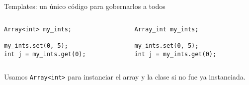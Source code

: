 \begin{frame}[fragile]{Templates: un \'unico c\'odigo para gobernarlos a todos}
   \begin{columns}
      \begin{column}{.5\linewidth}
         \begin{lstlisting}[style=normal]
Array<int> my_ints;

my_ints.set(0, 5);
int j = my_ints.get(0);
         \end{lstlisting}
      \end{column}
      \begin{column}{.42\linewidth}
         \begin{lstlisting}[style=normalnonumbers]
Array_int my_ints;

my_ints.set(0, 5);
int j = my_ints.get(0);
         \end{lstlisting}
      \end{column}
   \end{columns}
\vphantom{X}
Usamos \lstinline[style=normal]!Array<int>! para instanciar el array
y la clase si no fue ya instanciada.
\end{frame}

